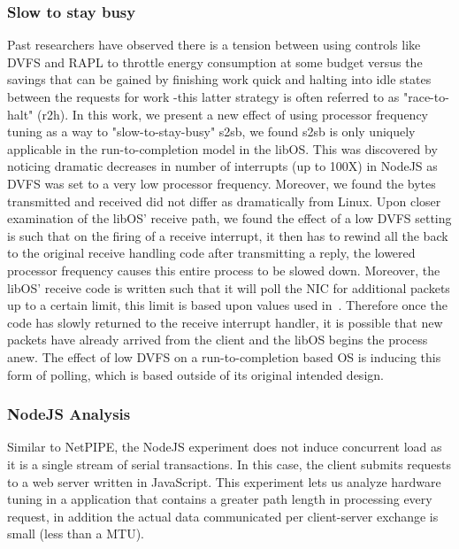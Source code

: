 \subsubsection{Slow to stay busy}
Past researchers have observed there is a tension between using controls like DVFS and RAPL to throttle energy consumption at some budget versus the savings that can be gained by finishing work quick and halting into idle states between the requests for work \cite{} -this latter strategy is often referred to as "race-to-halt" (r2h). In this work, we present a new effect of using processor frequency tuning as a way to "slow-to-stay-busy" s2sb, we found s2sb is only uniquely applicable in the run-to-completion model in the libOS. This was discovered by noticing dramatic decreases in number of interrupts (up to 100X) in NodeJS as DVFS was set to a very low processor frequency. Moreover, we found the bytes transmitted and received did not differ as dramatically from Linux. Upon closer examination of the libOS' receive path, we found the effect of a low DVFS setting is such that on the firing of a receive interrupt, it then has to rewind all the back to the original receive handling code after transmitting a reply, the lowered processor frequency causes this entire process to be slowed down. Moreover, the libOS' receive code is written such that it will poll the NIC for additional packets up to a certain limit, this limit is based upon values used in~\cite{}. Therefore once the code has slowly returned to the receive interrupt handler, it is possible that new packets have already arrived from the client and the libOS begins the process anew. The effect of low DVFS on a run-to-completion based OS is inducing this form of polling, which is based outside of its original intended design.

\subsubsection{NodeJS Analysis}
Similar to NetPIPE, the NodeJS experiment does not induce concurrent load as it is a single stream of serial transactions.  In this case, the client submits requests to a web server written in JavaScript.  This experiment lets us analyze hardware tuning in a application that contains a greater path length in processing every request, in addition the actual data communicated per client-server exchange is small (less than a MTU).  


